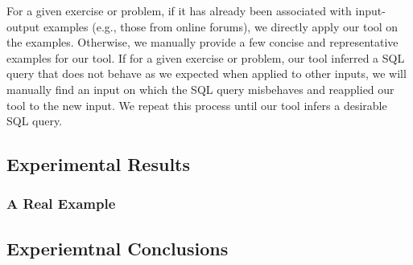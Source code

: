 For a given exercise or problem, if it
has already been associated with input-output examples (e.g.,
those from online forums), we directly apply our tool on the examples.
Otherwise, we manually provide a few concise and representative
examples for our tool.
If for a given exercise or problem, our tool inferred
a SQL query that does not behave as we expected when applied
to other inputs, we will manually find an input on which the
SQL query misbehaves and reapplied our tool to the new input. We
repeat this process until our tool infers a desirable SQL query.

\subsection{Experimental Results}


\subsubsection{A Real Example}


\subsection{Experiemtnal Conclusions}
